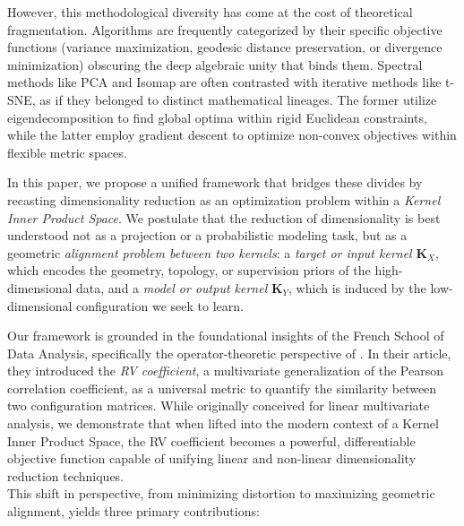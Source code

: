 \documentclass[11pt]{article}
\begin{document}
	However, this methodological diversity has come at the cost of theoretical fragmentation. Algorithms are frequently categorized by their specific objective functions (variance maximization, geodesic distance preservation, or divergence minimization) obscuring the deep algebraic unity that binds them. Spectral methods like PCA and Isomap are often contrasted with iterative methods like t-SNE, as if they belonged to distinct mathematical lineages. The former utilize eigendecomposition to find global optima within rigid Euclidean constraints, while the latter employ gradient descent to optimize non-convex objectives within flexible metric spaces.
	
	In this paper, we propose a unified framework that bridges these divides by recasting dimensionality reduction as an optimization problem within a \emph{Kernel Inner Product Space}. We postulate that the reduction of dimensionality is best understood not as a projection or a probabilistic modeling task, but as a geometric \emph{alignment problem between two kernels}: a \emph{target or input kernel} $\mathbf{K}_X$, which encodes the geometry, topology, or supervision priors of the high-dimensional data, and a \emph{model or output kernel} $\mathbf{K}_Y$, which is induced by the low-dimensional configuration we seek to learn.
	
	Our framework is grounded in the foundational insights of the French School of Data Analysis, specifically the operator-theoretic perspective of \citet{robert_unifying_1976}. In their article, they introduced the \emph{RV coefficient}, a multivariate generalization of the Pearson correlation coefficient, as a universal metric to quantify the similarity between two configuration matrices. While originally conceived for linear multivariate analysis, we demonstrate that when lifted into the modern context of a Kernel Inner Product Space, the RV coefficient becomes a powerful, differentiable objective function capable of unifying linear and non-linear dimensionality reduction techniques. \\
	
	This shift in perspective, from minimizing distortion to maximizing geometric alignment, yields three primary contributions:
	
\end{document}
